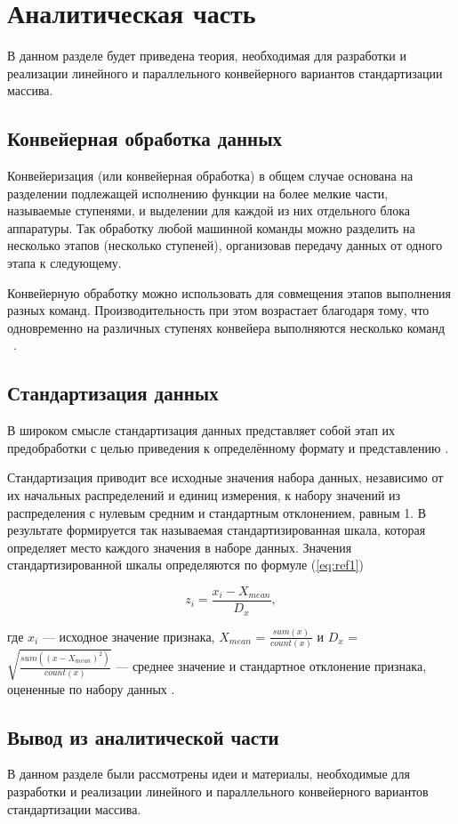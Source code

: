 \chapter{Аналитическая часть}

В данном разделе будет приведена теория, необходимая для разработки и реализации линейного и параллельного конвейерного вариантов стандартизации массива.

\section{Конвейерная обработка данных}

Конвейеризация (или конвейерная обработка) в общем случае основана на разделении подлежащей исполнению функции на более мелкие части, называемые ступенями, и выделении для каждой из них отдельного блока аппаратуры. Так обработку любой машинной команды можно разделить на несколько этапов (несколько ступеней), организовав передачу данных от одного этапа к следующему. 

Конвейерную обработку можно использовать для совмещения этапов выполнения разных команд. Производительность при этом возрастает благодаря тому, что одновременно на различных ступенях конвейера выполняются несколько команд ~\cite{second_article}.


\section{Стандартизация данных}

В широком смысле стандартизация данных представляет собой этап их предобработки с целью приведения к определённому формату и представлению \cite{third_article}.

 Стандартизация приводит все исходные значения набора данных, независимо от их начальных распределений и единиц измерения, к набору значений из распределения с нулевым средним и стандартным отклонением, равным 1. В результате формируется так называемая стандартизированная шкала, которая определяет место каждого значения в наборе данных. Значения стандартизированной шкалы определяются по формуле (\ref{eq:ref1})
 
 \begin{equation}
 	z_i = \frac{x_i - X_{mean}}{D_x},\label{eq:ref1}
 \end{equation}

где $x_i$ — исходное значение признака, $X_{mean}$ =  $\frac{sum(x)}{count(x)}$ и $D_x$ = $\sqrt{\frac{sum((x - X_{mean})^2)}{count(x)}}$ — среднее значение и стандартное отклонение признака, оцененные по набору данных \cite{fourth_article}.




\section{Вывод из аналитической части}
В данном разделе были рассмотрены идеи и материалы, необходимые для разработки и реализации линейного и параллельного конвейерного вариантов стандартизации массива.

